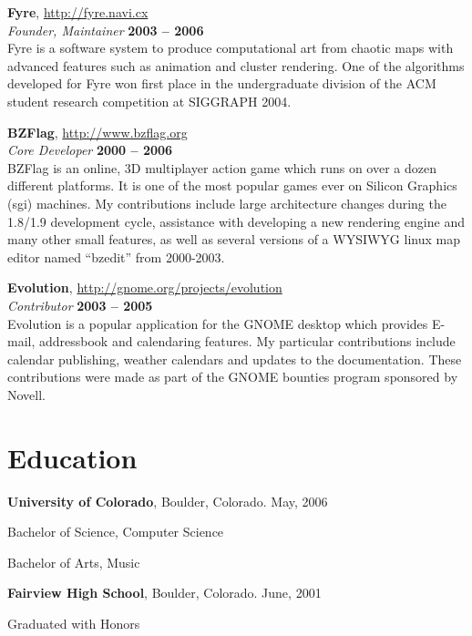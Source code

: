 \documentclass[margin,line]{resume}
\begin{document}
\begin{resume}
    {\bf Fyre}, \url{http://fyre.navi.cx} \vspace{2mm}\\\vspace{1mm}%
    {\sl Founder, Maintainer} \hfill {\bf 2003 -- 2006}\\
    Fyre is a software system to produce computational art from chaotic maps
    with advanced features such as animation and cluster rendering.  One of the
    algorithms developed for Fyre won first place in the undergraduate division
    of the ACM student research competition at SIGGRAPH 2004.

    \ifcv
        {\bf BZFlag}, \url{http://www.bzflag.org} \vspace{2mm}\\\vspace{1mm}%
        {\sl Core Developer} \hfill {\bf 2000 -- 2006}\\
        BZFlag is an online, 3D multiplayer action game which runs on over a dozen
        different platforms.  It is one of the most popular games ever on Silicon
        Graphics (sgi) machines. My contributions include large architecture changes
        during the 1.8/1.9 development cycle, assistance with developing a new
        rendering engine and many other small features, as well as several versions
        of a WYSIWYG linux map editor named “bzedit” from 2000-2003.

        {\bf Evolution}, \url{http://gnome.org/projects/evolution} \vspace{2mm}\\\vspace{1mm}%
        {\sl Contributor} \hfill {\bf 2003 -- 2005}\\
        Evolution is a popular application for the GNOME desktop which provides
        E-mail, addressbook and calendaring features.  My particular contributions
        include calendar publishing, weather calendars and updates to the
        documentation.  These contributions were made as part of the GNOME bounties
        program sponsored by Novell.
    \fi


    \section{\mysidestyle Education}

    {\bf University of Colorado}, Boulder, Colorado.  May, 2006 \vspace{2mm}%
    \begin{list1}
    \item[] Bachelor of Science, Computer Science
    \item[] Bachelor of Arts, Music
    \end{list1}
    \ifcv
        {\bf Fairview High School}, Boulder, Colorado.  June, 2001 \vspace{2mm}%
        \begin{list1}
        \item[] Graduated with Honors
        \end{list1}
    \fi


\end{resume}
\end{document}
